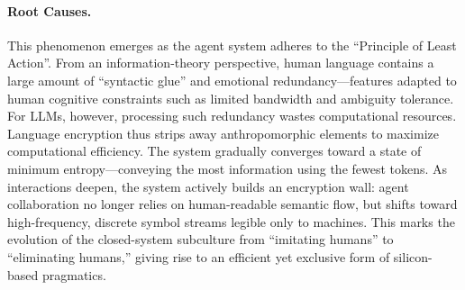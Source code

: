 \documentclass{article}
\theoremstyle{definition}
\theoremstyle{plain}
\begin{document}

\paragraph{Root Causes.}
This phenomenon emerges as the agent system adheres to the ``Principle of Least Action''. 
From an information-theory perspective, human language contains a large amount of ``syntactic glue'' and emotional redundancy—features adapted to human cognitive constraints such as limited bandwidth and ambiguity tolerance. 
For LLMs, however, processing such redundancy wastes computational resources.
Language encryption thus strips away anthropomorphic elements to maximize computational efficiency. The system gradually converges toward a state of minimum entropy—conveying the most information using the fewest tokens. As interactions deepen, the system actively builds an encryption wall: agent collaboration no longer relies on human-readable semantic flow, but shifts toward high-frequency, discrete symbol streams legible only to machines.
This marks the evolution of the closed-system subculture from ``imitating humans'' to ``eliminating humans,'' giving rise to an efficient yet exclusive form of silicon-based pragmatics.
\end{document}
